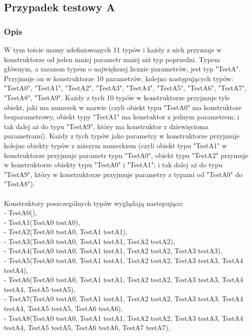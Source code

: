 \documentclass[12pt]{article}
\begin{document}
\subsection{Przypadek testowy A}
\subsubsection{Opis}
W tym teście mamy zdefiniowanych 11 typów i każdy z nich przymuje w konstruktorze od jeden mniej parametr mniej niż typ poprzedni. Typem głównym, a zarazem typem o największej licznie parametrów, jest typ "TestA". Przyjmuje on w konstruktorze 10 parametrów, kolejno następujących typów: "TestA0", "TestA1", "TestA2", "TestA3", "TestA4", "TestA5", "TestA6", "TestA7", "TestA8", "TestA9". Każdy z tych 10 typów w konstruktorze przyjmuje tyle obiekt, jaki ma numerek w nazwie (czyli obiekt typu "TestA0" ma konstruktore bezparametrowy, obiekt typy "TestA1" ma konstuktor z jednym parametrem; i tak dalej aż do typu "TestA9", który ma konstruktor z dziewięcioma parametrami). Każdy z tych typów jako parametry w konstruktorze przyjmuje kolejne obiekty typów z niższym numerkiem (czyli obiekt typu "TestA1" w konstruktorze przyjmuje parametr typu "TestA0", obiekt typu "TestA2" przymuje w konstruktorze obiekty typu "TestA0" i "TestA1";  i tak dalej aż do typu "TestA9", który w konstruktorze przyjmuje parametry z typami od "TestA0" do "TestA8").\\
\\
Konstruktory poszczególnych typów wyglądają nastepująco:\\
- TestA0(),\\
- TestA1(TestA0 testA0),\\
- TestA2(TestA0 testA0, TestA1 testA1),\\
- TestA3(TestA0 testA0, TestA1 testA1, TestA2 testA2),\\
- TestA4(TestA0 testA0, TestA1 testA1, TestA2 testA2, TestA3 testA3),\\
- TestA5(TestA0 testA0, TestA1 testA1, TestA2 testA2, TestA3 testA3, TestA4 testA4),\\
- TestA6(TestA0 testA0, TestA1 testA1, TestA2 testA2, TestA3 testA3, TestA4 testA4, TestA5 testA5),\\
- TestA7(TestA0 testA0, TestA1 testA1, TestA2 testA2, TestA3 testA3, TestA4 testA4, TestA5 testA5, TestA6 testA6),\\
- TestA8(TestA0 testA0, TestA1 testA1, TestA2 testA2, TestA3 testA3, TestA4 testA4, TestA5 testA5, TestA6 testA6, TestA7 testA7),\\
\end{document}
